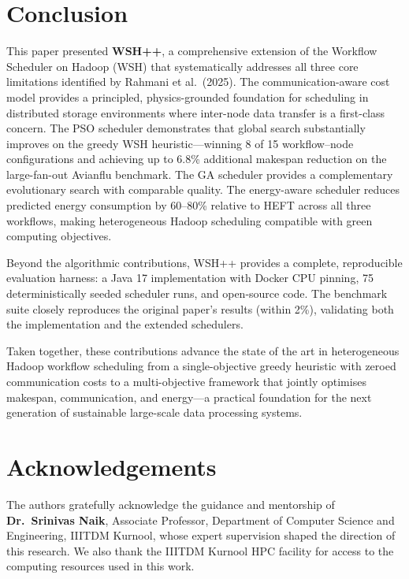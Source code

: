 \documentclass[10pt,twocolumn]{article}
\begin{document}
\section{Conclusion}
\label{sec:conclusion}

This paper presented \textbf{WSH++}, a comprehensive extension of the Workflow
Scheduler on Hadoop (WSH) that systematically addresses all three core limitations
identified by Rahmani et al.\ (2025). The communication-aware cost model provides a
principled, physics-grounded foundation for scheduling in distributed storage
environments where inter-node data transfer is a first-class concern. The PSO
scheduler demonstrates that global search substantially improves on the greedy WSH
heuristic---winning 8 of 15 workflow--node configurations and achieving up to 6.8\%
additional makespan reduction on the large-fan-out Avianflu benchmark. The GA
scheduler provides a complementary evolutionary search with comparable quality.
The energy-aware scheduler reduces predicted energy consumption by 60--80\% relative
to HEFT across all three workflows, making heterogeneous Hadoop scheduling compatible
with green computing objectives.

Beyond the algorithmic contributions, WSH++ provides a complete, reproducible
evaluation harness: a Java 17 implementation with Docker CPU pinning, 75
deterministically seeded scheduler runs, and open-source code. The benchmark suite
closely reproduces the original paper's results (within 2\%), validating both the
implementation and the extended schedulers.

Taken together, these contributions advance the state of the art in heterogeneous
Hadoop workflow scheduling from a single-objective greedy heuristic with zeroed
communication costs to a multi-objective framework that jointly optimises makespan,
communication, and energy---a practical foundation for the next generation of
sustainable large-scale data processing systems.

\section*{Acknowledgements}

The authors gratefully acknowledge the guidance and mentorship of
\textbf{Dr.~Srinivas Naik}, Associate Professor, Department of Computer Science and
Engineering, IIITDM Kurnool, whose expert supervision shaped the direction of this
research. We also thank the IIITDM Kurnool HPC facility for access to the computing
resources used in this work.
\end{document}
